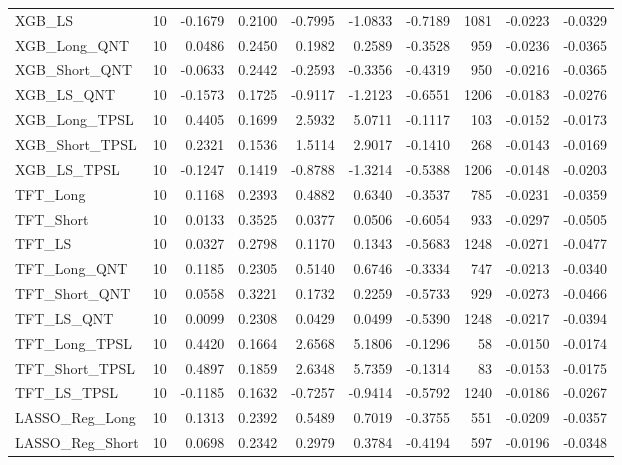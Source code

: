 \begin{tabular}{llrrrrrrrr}
\cline{1-10}
XGB\_LS & 10 & -0.1679 & 0.2100 & -0.7995 & -1.0833 & -0.7189 & 1081 & -0.0223 & -0.0329 \\
\cline{1-10}
XGB\_Long\_QNT & 10 & 0.0486 & 0.2450 & 0.1982 & 0.2589 & -0.3528 & 959 & -0.0236 & -0.0365 \\
\cline{1-10}
XGB\_Short\_QNT & 10 & -0.0633 & 0.2442 & -0.2593 & -0.3356 & -0.4319 & 950 & -0.0216 & -0.0365 \\
\cline{1-10}
XGB\_LS\_QNT & 10 & -0.1573 & 0.1725 & -0.9117 & -1.2123 & -0.6551 & 1206 & -0.0183 & -0.0276 \\
\cline{1-10}
XGB\_Long\_TPSL & 10 & 0.4405 & 0.1699 & 2.5932 & 5.0711 & -0.1117 & 103 & -0.0152 & -0.0173 \\
\cline{1-10}
XGB\_Short\_TPSL & 10 & 0.2321 & 0.1536 & 1.5114 & 2.9017 & -0.1410 & 268 & -0.0143 & -0.0169 \\
\cline{1-10}
XGB\_LS\_TPSL & 10 & -0.1247 & 0.1419 & -0.8788 & -1.3214 & -0.5388 & 1206 & -0.0148 & -0.0203 \\
\cline{1-10}
TFT\_Long & 10 & 0.1168 & 0.2393 & 0.4882 & 0.6340 & -0.3537 & 785 & -0.0231 & -0.0359 \\
\cline{1-10}
TFT\_Short & 10 & 0.0133 & 0.3525 & 0.0377 & 0.0506 & -0.6054 & 933 & -0.0297 & -0.0505 \\
\cline{1-10}
TFT\_LS & 10 & 0.0327 & 0.2798 & 0.1170 & 0.1343 & -0.5683 & 1248 & -0.0271 & -0.0477 \\
\cline{1-10}
TFT\_Long\_QNT & 10 & 0.1185 & 0.2305 & 0.5140 & 0.6746 & -0.3334 & 747 & -0.0213 & -0.0340 \\
\cline{1-10}
TFT\_Short\_QNT & 10 & 0.0558 & 0.3221 & 0.1732 & 0.2259 & -0.5733 & 929 & -0.0273 & -0.0466 \\
\cline{1-10}
TFT\_LS\_QNT & 10 & 0.0099 & 0.2308 & 0.0429 & 0.0499 & -0.5390 & 1248 & -0.0217 & -0.0394 \\
\cline{1-10}
TFT\_Long\_TPSL & 10 & 0.4420 & 0.1664 & 2.6568 & 5.1806 & -0.1296 & 58 & -0.0150 & -0.0174 \\
\cline{1-10}
TFT\_Short\_TPSL & 10 & 0.4897 & 0.1859 & 2.6348 & 5.7359 & -0.1314 & 83 & -0.0153 & -0.0175 \\
\cline{1-10}
TFT\_LS\_TPSL & 10 & -0.1185 & 0.1632 & -0.7257 & -0.9414 & -0.5792 & 1240 & -0.0186 & -0.0267 \\
\cline{1-10}
LASSO\_Reg\_Long & 10 & 0.1313 & 0.2392 & 0.5489 & 0.7019 & -0.3755 & 551 & -0.0209 & -0.0357 \\
\cline{1-10}
LASSO\_Reg\_Short & 10 & 0.0698 & 0.2342 & 0.2979 & 0.3784 & -0.4194 & 597 & -0.0196 & -0.0348 \\

\end{tabular}
